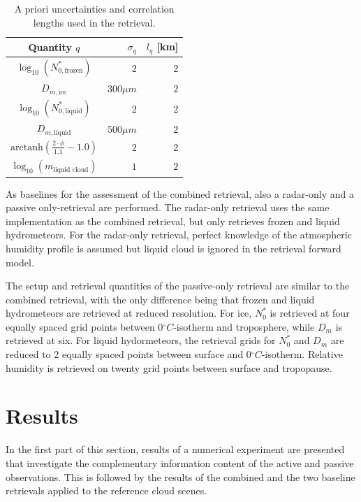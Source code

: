 \documentclass[journal abbreviation, manuscript]{copernicus}
\begin{document}
\begin{table}[h!]
\caption{A priori uncertainties and correlation
 lengths used in the retrieval.}
 \centering
\label{tab:a_priori}
    \begin{tabular}{c|r|r}
     Quantity $q$ & $\sigma_q$ & $l_q$ [km]\\
    \hline
    $\log_{10}(N_{0, \text{frozen}}^*)$    & $2$                       & $2$ \\
    $D_{m, \text{ice}}$               & $300\unit{\mu m}$ & $2$ \\
    $\log_{10}(N_{0, \text{liquid}}^*)$    & $2                      $ & $2$ \\
    $D_{m, \text{liquid}}$            & $500\unit{\mu m}$ & $2$ \\
    $\text{arctanh}(\frac{2 \cdot \phi}{1.1} - 1.0)$ & $2$                       & $2$ \\
    $\log_{10}(m_\text{liquid cloud}) $ & $1$                       & $2$ \\
    \end{tabular}
\end{table}

As baselines for the assessment of the combined retrieval, also a radar-only and
a passive only-retrieval are performed. The radar-only retrieval uses the same
implementation as the combined retrieval, but only retrieves frozen and liquid
hydrometeors. For the radar-only retrieval, perfect knowledge of the atmospheric
humidity profile is assumed but liquid cloud is ignored in the retrieval forward
model.

The setup and retrieval quantities of the passive-only retrieval are similar to
the combined retrieval, with the only difference being that frozen and liquid
hydrometeors are retrieved at reduced resolution. For ice, $N_0^*$ is retrieved
at four equally spaced grid points between $0\unit{^\circ C}$-isotherm and
troposphere, while $D_m$ is retrieved at six. For liquid hydormeteors, the
retrieval grids for $N_0^*$ and $D_m$ are reduced to 2 equally spaced points
between surface and $0\unit{^\circ C}$-isotherm. Relative humidity is retrieved
on twenty grid points between surface and tropopause.

\section{Results}
\label{sec:results}

In the first part of this section, results of a numerical experiment are
presented that investigate the complementary information content of the active
and passive observations. This is followed by the results of the combined and
the two baseline retrievals applied to the reference cloud scenes.
\end{document}

